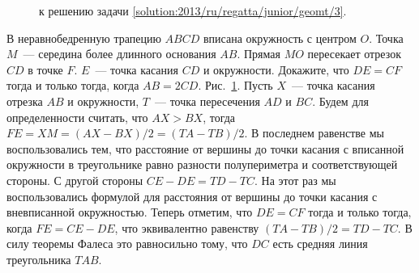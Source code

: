 \ifsolution
\begin{figure}\centering
    \caption{к решению задачи \ref{solution:2013/ru/regatta/junior/geomt/3}.}
    \label{fig:solution:2013/ru/regatta/junior/geomt/3}
\end{figure}%
\fi %

\problem
В неравнобедренную трапецию $ABCD$ вписана окружность с центром $O$.
Точка $M$~--- середина более длинного основания $AB$.
Прямая $MO$ пересекает отрезок $CD$ в точке $F$.
$E$~--- точка касания $CD$ и окружности.
Докажите, что $DE = CF$ тогда и только тогда, когда $AB = 2 CD$.
\solution
\label{solution:2013/ru/regatta/junior/geomt/3}%
Рис.~\ref{fig:solution:2013/ru/regatta/junior/geomt/3}.
Пусть $X$~--- точка касания отрезка $AB$ и окружности, $T$~--- точка
пересечения $AD$ и $BC$.
Будем для определенности считать, что $AX > BX$, тогда
$FE = XM = (AX - BX) / 2 = (TA - TB) / 2$.
В последнем равенстве мы воспользовались тем, что расстояние от вершины до
точки касания с вписанной окружности в треугольнике равно разности
полупериметра и соответствующей стороны.
С другой стороны $CE - DE = TD - TC$.
На этот раз мы воспользовались формулой для расстояния от вершины до точки
касания с вневписанной окружностью.
Теперь отметим, что $DE = CF$ тогда и только тогда, когда $FE = CE - DE$, что
эквивалентно равенству $(TA - TB) / 2 = TD - TC$.
В силу теоремы Фалеса это равносильно тому, что $DC$ есть средняя линия
треугольника $TAB$.
\endproblem

